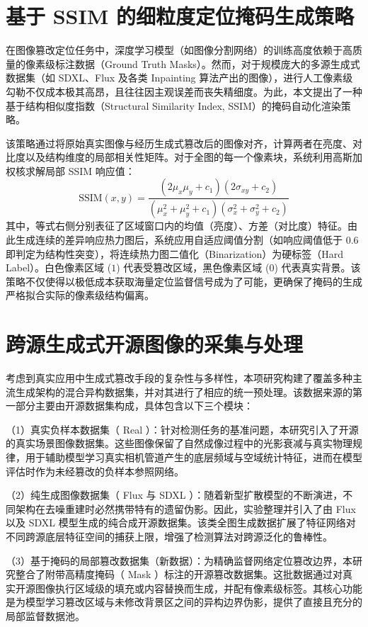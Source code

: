 \documentclass[UTF8, a4paper, 12pt]{ctexrep}
\begin{document}
\section{基于 SSIM 的细粒度定位掩码生成策略}
在图像篡改定位任务中，深度学习模型（如图像分割网络）的训练高度依赖于高质量的像素级标注数据（Ground Truth Masks）。然而，对于规模庞大的多源生成式数据集（如 SDXL、Flux 及各类 Inpainting 算法产出的图像），进行人工像素级勾勒不仅成本极其高昂，且往往因主观误差而丧失精细度。为此，本文提出了一种基于结构相似度指数（Structural Similarity Index, SSIM）的掩码自动化渲染策略。

该策略通过将原始真实图像与经历生成式篡改后的图像对齐，计算两者在亮度、对比度以及结构维度的局部相关性矩阵。对于全图的每一个像素块，系统利用高斯加权核求解局部 SSIM 响应值：
\begin{equation}
    \text{SSIM}(x, y) = \frac{(2\mu_x\mu_y + c_1)(2\sigma_{xy} + c_2)}{(\mu_x^2 + \mu_y^2 + c_1)(\sigma_x^2 + \sigma_y^2 + c_2)}
\end{equation}
其中，等式右侧分别表征了区域窗口内的均值（亮度）、方差（对比度）特征。由此生成连续的差异响应热力图后，系统应用自适应阈值分割（如响应阈值低于 $0.6$ 即判定为结构性突变），将连续热力图二值化（Binarization）为硬标签（Hard Label）。白色像素区域 ($1$) 代表受篡改区域，黑色像素区域 ($0$) 代表真实背景。该策略不仅使得以极低成本获取海量定位监督信号成为了可能，更确保了掩码的生成严格拟合实际的像素级结构偏离。

\section{跨源生成式开源图像的采集与处理}
考虑到真实应用中生成式篡改手段的复杂性与多样性，本项研究构建了覆盖多种主流生成架构的混合异构数据集，并对其进行了相应的统一预处理。该数据来源的第一部分主要由开源数据集构成，具体包含以下三个模块：

（1）真实负样本数据集（ Real ）：针对检测任务的基准问题，本研究引入了开源的真实场景图像数据集。这些图像保留了自然成像过程中的光影衰减与真实物理规律，用于辅助模型学习真实相机管道产生的底层频域与空域统计特征，进而在模型评估时作为未经篡改的负样本参照网络。

（2）纯生成图像数据集（ Flux 与 SDXL ）：随着新型扩散模型的不断演进，不同架构在去噪重建时必然携带特有的遗留伪影。因此，实验整理并引入了由 Flux 以及 SDXL 模型生成的纯合成开源数据集。该类全图生成数据扩展了特征网络对不同跨源底层特征空间的捕获上限，增强了检测算法对跨源泛化的鲁棒性。

（3）基于掩码的局部篡改数据集（新数据）：为精确监督网络定位篡改边界，本研究整合了附带高精度掩码（ Mask ）标注的开源篡改数据集。这批数据通过对真实开源图像执行区域级的填充或内容替换而生成，并配有像素级标签。其核心功能是为模型学习篡改区域与未修改背景区之间的异构边界伪影，提供了直接且充分的局部监督数据池。
\end{document}
